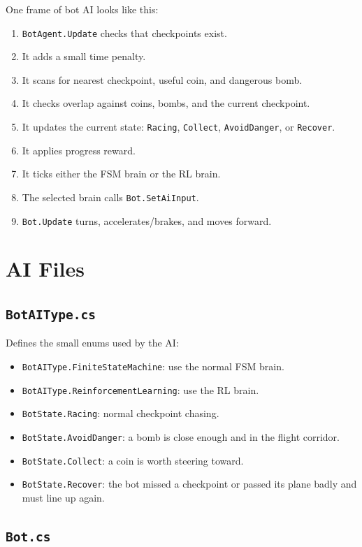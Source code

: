 \documentclass[11pt]{article}
\newcommand{\file}[1]{\texttt{#1}}
\newcommand{\code}[1]{{\footnotesize\texttt{#1}}}
\begin{document}
One frame of bot AI looks like this:

\begin{enumerate}
    \item \code{BotAgent.Update} checks that checkpoints exist.
    \item It adds a small time penalty.
    \item It scans for nearest checkpoint, useful coin, and dangerous bomb.
    \item It checks overlap against coins, bombs, and the current checkpoint.
    \item It updates the current state: \code{Racing}, \code{Collect}, \code{AvoidDanger}, or \code{Recover}.
    \item It applies progress reward.
    \item It ticks either the FSM brain or the RL brain.
    \item The selected brain calls \code{Bot.SetAiInput}.
    \item \code{Bot.Update} turns, accelerates/brakes, and moves forward.
\end{enumerate}

\section{AI Files}

\subsection{\file{BotAIType.cs}}

Defines the small enums used by the AI:

\begin{itemize}
    \item \code{BotAIType.FiniteStateMachine}: use the normal FSM brain.
    \item \code{BotAIType.ReinforcementLearning}: use the RL brain.
    \item \code{BotState.Racing}: normal checkpoint chasing.
    \item \code{BotState.AvoidDanger}: a bomb is close enough and in the flight corridor.
    \item \code{BotState.Collect}: a coin is worth steering toward.
    \item \code{BotState.Recover}: the bot missed a checkpoint or passed its plane badly and must line up again.
\end{itemize}

\subsection{\file{Bot.cs}}
\end{document}
